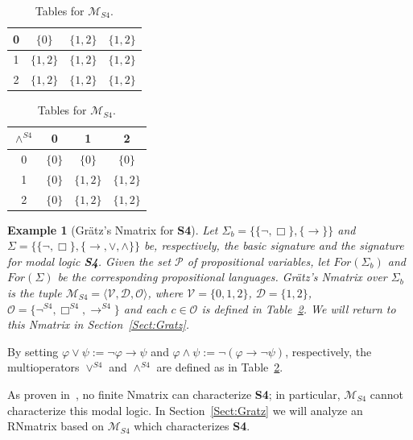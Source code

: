 \documentclass[12pt]{article}
\newtheorem{example}[theorem]{Example}
\newcommand{\sfo}{\textbf{S4}}
\begin{document}
\begin{table}
\begin{tabular}{|c|c|c|c|}
        0                                & $\{ 0 \}$ & $\{ 1,2 \}$ & $\{ 1,2 \}$ \\ \hline
        1                                & $\{ 1,2 \}$   & $\{ 1,2 \}$ & $\{ 1,2 \}$ \\ \hline
        2                                & $\{ 1,2 \}$   & $\{ 1,2 \}$   & $\{ 1,2 \}$ \\ \hline
    \end{tabular}
    \begin{tabular}{|c|c|c|c|}
        \hline
        $\land^{S4}$ & 0           & 1           & 2           \\ \hline\hline
        0                                & $\{ 0 \}$ & $\{ 0 \}$ & $\{ 0 \}$ \\ \hline
        1                                & $\{ 0 \}$   & $\{ 1,2 \}$ & $\{ 1,2 \}$ \\ \hline
        2                                & $\{ 0 \}$   & $\{ 1,2 \}$   & $\{ 1,2 \}$ \\ \hline
    \end{tabular}
    \caption{Tables for $\mathcal{M}_{S4}$.}\label{table:nm_S4*}
\end{table}

\begin{example}[Gr\"atz's Nmatrix for \textbf{S4}]\label{def:gratz_nmatrix_s4}
    Let $\Sigma_b = \{ \{ \neg, \Box \}, \{\rightarrow\} \}$ and $\Sigma = \{ \{ \neg, \Box \}, \{\rightarrow, \lor, \land \} \}$ be, respectively, {\em  the basic signature} and  {\em  the signature}  for modal logic \sfo. Given the set $\mathcal{P}$ of propositional variables, let $For(\Sigma_b)$ and  $For(\Sigma)$ be the corresponding propositional languages. Gr\"atz's Nmatrix over $\Sigma_b$ is the tuple $\mathcal{M}_{S4} = \langle  \mathcal{V}, \mathcal{D}, \mathcal{O} \rangle$, where $\mathcal{V} = \{ 0, 1, 2 \}$, $\mathcal{D} = \{ 1, 2\}$, $\mathcal{O} = \{ \neg^{S4}, \Box^{S4} , \rightarrow^{S4} \}$ and each $c \in \mathcal{O}$ is defined in Table~\ref{table:nm_S4*}. We will return to this Nmatrix in Section~\ref{Sect:Gratz}.
\end{example}


By setting $\varphi \lor \psi := \neg \varphi \to \psi $ and $\varphi \land \psi := \neg (\varphi \to \neg \psi)$, respectively, the multioperators $\lor^{S4}$ and $\land^{S4}$ are defined as in Table~\ref{table:nm_S4*}.

As proven in~\cite{gratz_truth_2022}, no finite Nmatrix can characterize \sfo; in particular, $\mathcal{M}_{S4}$ cannot characterize this modal logic. In Section~\ref{Sect:Gratz} we will analyze an RNmatrix based on $\mathcal{M}_{S4}$ which characterizes \sfo.
\end{document}
